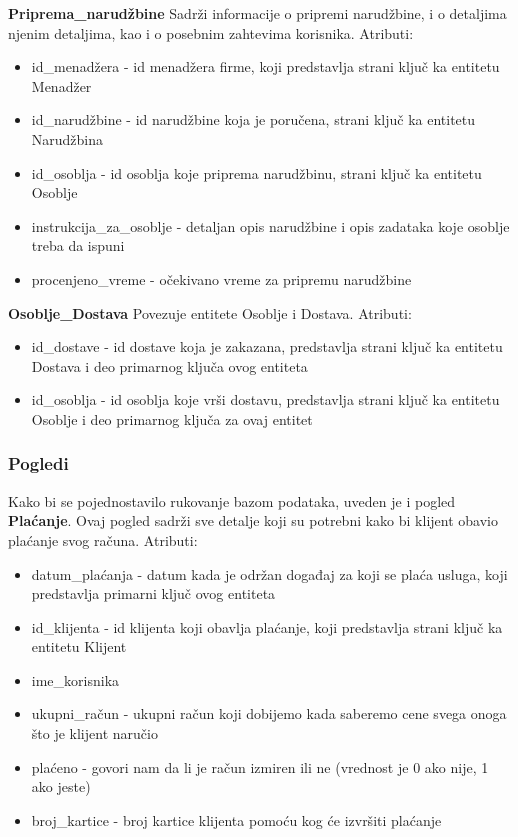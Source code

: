 \documentclass[a4paper]{article}
\begin{document}
\vspace{3mm}

\textbf{Priprema\_narudžbine} Sadrži informacije o pripremi narudžbine, i o detaljima njenim detaljima, kao i o posebnim zahtevima korisnika. Atributi:
\begin{itemize}
    \item id\_menadžera - id menadžera firme, koji predstavlja strani ključ ka entitetu Menadžer
    \item id\_narudžbine - id narudžbine koja je poručena, strani ključ ka entitetu Narudžbina
    \item id\_osoblja - id osoblja koje priprema narudžbinu, strani ključ ka entitetu Osoblje
    \item instrukcija\_za\_osoblje - detaljan opis narudžbine i opis zadataka koje osoblje treba da ispuni
    \item procenjeno\_vreme - očekivano vreme za pripremu narudžbine
    
\end{itemize}

\vspace{3mm}

\textbf{Osoblje\_Dostava} Povezuje entitete Osoblje i Dostava. Atributi:
\begin{itemize}
    \item id\_dostave - id dostave koja je zakazana, predstavlja strani ključ ka entitetu Dostava i deo primarnog ključa ovog entiteta
    \item id\_osoblja - id osoblja koje vrši dostavu, predstavlja strani ključ ka entitetu Osoblje i deo primarnog ključa za ovaj entitet
    
\end{itemize}

\vspace{3mm}


\subsubsection{Pogledi}

Kako bi se pojednostavilo rukovanje bazom podataka, uveden je i pogled \textbf{Plaćanje}. Ovaj pogled sadrži sve detalje koji su potrebni kako bi klijent obavio plaćanje svog računa. Atributi:
\begin{itemize}
    \item datum\_plaćanja - datum kada je održan događaj za koji se plaća usluga, koji predstavlja primarni ključ ovog entiteta
    \item id\_klijenta - id klijenta koji obavlja plaćanje, koji predstavlja strani ključ ka entitetu Klijent
    \item ime\_korisnika 
    \item ukupni\_račun - ukupni račun koji dobijemo kada saberemo cene svega onoga što je klijent naručio
    \item plaćeno - govori nam da li je račun izmiren ili ne (vrednost je 0 ako nije, 1 ako jeste)
    \item broj\_kartice - broj kartice klijenta pomoću kog će izvršiti plaćanje
\end{itemize}
\end{document}
